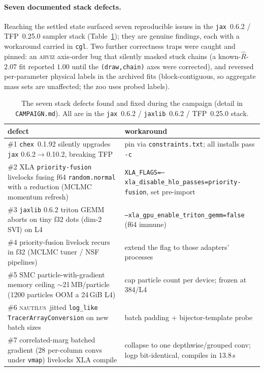 \documentclass[11pt,letterpaper]{article}
\newcommand{\Rhat}{\ensuremath{\hat{R}}}
\newcommand{\nautilus}{\textsc{nautilus}}
\begin{document}
\paragraph{Seven documented stack defects.} Reaching the settled state surfaced
seven reproducible issues in the \texttt{jax}~0.6.2 / TFP~0.25.0 sampler stack
(Table~\ref{tab:defects}); they are genuine findings, each with a workaround
carried in \texttt{cgl}. Two further correctness traps were caught and pinned:
an \textsc{arviz} axis-order bug that silently masked stuck chains (a
known-$\Rhat$-$2.07$ fit reported $1.00$ until the \texttt{(draw,chain)} axes
were corrected), and reversed per-parameter physical labels in the archived
\citet{gu2022gigalens} fits (block-contiguous, so aggregate mass sets are
unaffected; the zoo uses probed labels).

\begin{table}[ht]
\centering
\caption{The seven stack defects found and fixed during the campaign (detail in
\texttt{CAMPAIGN.md}). All are in the \texttt{jax}~0.6.2 / \texttt{jaxlib}~0.6.2
/ TFP~0.25.0 stack.}
\label{tab:defects}
\small
\begin{tabular}{p{}p{}}
\toprule
defect & workaround \\
\midrule
\#1 \texttt{chex}~0.1.92 silently upgrades \texttt{jax} 0.6.2$\to$0.10.2, breaking TFP & pin via \texttt{constraints.txt}; all installs pass \texttt{-c} \\
\#2 XLA \texttt{priority-fusion} livelocks fusing f64 \texttt{random.normal} with a reduction (MCLMC momentum refresh) & \texttt{XLA\_FLAGS=--xla\_disable\_hlo\_passes=priority-fusion}, set pre-import \\
\#3 \texttt{jaxlib} 0.6.2 triton GEMM aborts on tiny f32 dots (dim-2 SVI) on L4 & \texttt{--xla\_gpu\_enable\_triton\_gemm=false} (f64 immune) \\
\#4 priority-fusion livelock recurs in f32 (MCLMC tuner / NSF pipelines) & extend the flag to those adapters' processes \\
\#5 SMC particle-with-gradient memory ceiling $\sim$21\,MB/particle (1200 particles OOM a 24\,GiB L4) & cap particle count per device; frozen at 384/L4 \\
\#6 \nautilus\ jitted \texttt{log\_like} \texttt{TracerArrayConversion} on new batch sizes & batch padding + bijector-template probe \\
\#7 correlated-marg batched gradient ($28$ per-column convs under \texttt{vmap}) livelocks XLA compile & collapse to one depthwise/grouped conv; logp bit-identical, compiles in 13.8\,s \\
\bottomrule
\end{tabular}
\end{table}
\end{document}
